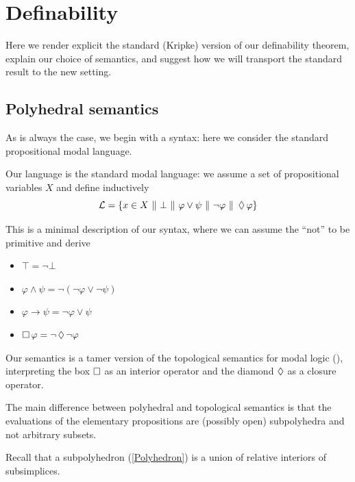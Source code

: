 \section{Definability}
Here we render explicit the standard (Kripke) version of our definability theorem, explain our choice of semantics, 
and suggest how we will transport the standard result to the new setting.

\subsection{Polyhedral semantics}
As is always the case, we begin with a syntax: here we consider the standard propositional modal language.
\begin{definition}
    Our language is the standard modal language: 
    we assume a set of propositional variables $X$ 
    and define inductively
    \[\Ll = \set{x\in X \ \|\ \bot\ \|\ \varphi\vee\psi\ \|\ \lnot\varphi\ \|\ \d\varphi}\]
\end{definition}
This is a minimal description of our syntax, 
where we can assume the ``not'' to be primitive and derive 
\begin{itemize}
    \item $\top=\lnot\bot$
    \item $\varphi \wedge \psi=\lnot(\lnot \varphi\vee\lnot\psi)$
    \item $\varphi\to\psi=\lnot \varphi\vee\psi$
    \item $\operatorname{\Box} \varphi=\lnot\operatorname{\Diamond}\lnot\varphi$
\end{itemize}
Our semantics is a tamer version of the topological 
semantics for modal logic (\cite{Gabelaia2001ModalDI}), 
interpreting the box $\operatorname{\Box}$ as an interior operator
and the diamond $\operatorname{\Diamond}$ as a closure operator.

The main difference between polyhedral and topological semantics 
is that the evaluations of the elementary propositions are 
(possibly open) subpolyhedra and not arbitrary subsets.

Recall that a subpolyhedron (\ref{Polyhedron}) is a union of relative interiors of subsimplices.

